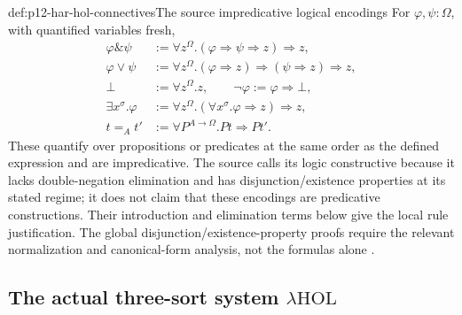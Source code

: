 \begin{hbdefinition}{def:p12-har-hol-connectives}{The source impredicative logical encodings}
For \(\varphi,\psi:\Omega\), with quantified variables fresh,
\[
\begin{aligned}
 \varphi\mathbin{\&}\psi&:=\forall z^\Omega.
       (\varphi\Rightarrow\psi\Rightarrow z)\Rightarrow z,\\
 \varphi\lor\psi&:=\forall z^\Omega.
       (\varphi\Rightarrow z)\Rightarrow(\psi\Rightarrow z)\Rightarrow z,\\
 \bot&:=\forall z^\Omega.z,\qquad
 \neg\varphi:=\varphi\Rightarrow\bot,\\
 \exists x^\sigma.\varphi&:=\forall z^\Omega.
       (\forall x^\sigma.\varphi\Rightarrow z)\Rightarrow z,\\
 t=_A t'&:=\forall P^{A\to\Omega}.Pt\Rightarrow Pt'.
\end{aligned}
\]
These quantify over propositions or predicates at the same order as the
defined expression and are impredicative. The source calls its logic
constructive because it lacks double-negation elimination and has
disjunction/existence properties at its stated regime; it does not claim
that these encodings are predicative constructions. Their introduction and
elimination terms below give the local rule justification. The global
disjunction/existence-property proofs require the relevant normalization
and canonical-form analysis, not the formulas alone
\cite[pp.~1183--1185, Example~3.6]{BarendregtGeuvers2001}.
\end{hbdefinition}

\subsection{The actual three-sort system \(\lambda\mathrm{HOL}\)}

